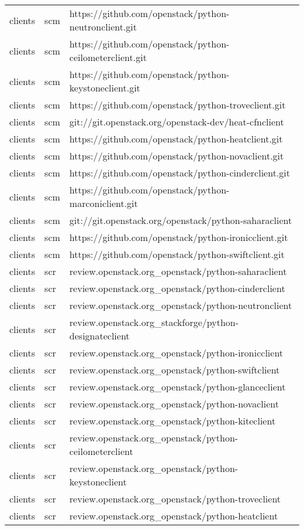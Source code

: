 \begin{center}
\begin{longtable}{|p{4cm}|p{1cm}|p{10cm}|}
clients&scm&https://github.com/openstack/python-neutronclient.git\\ 
clients&scm&https://github.com/openstack/python-ceilometerclient.git\\ 
clients&scm&https://github.com/openstack/python-keystoneclient.git\\ 
clients&scm&https://github.com/openstack/python-troveclient.git\\ 
clients&scm&git://git.openstack.org/openstack-dev/heat-cfnclient\\ 
clients&scm&https://github.com/openstack/python-heatclient.git\\ 
clients&scm&https://github.com/openstack/python-novaclient.git\\ 
clients&scm&https://github.com/openstack/python-cinderclient.git\\ 
clients&scm&https://github.com/openstack/python-marconiclient.git\\ 
clients&scm&git://git.openstack.org/openstack/python-saharaclient\\ 
clients&scm&https://github.com/openstack/python-ironicclient.git\\ 
clients&scm&https://github.com/openstack/python-swiftclient.git\\ 
clients&scr&review.openstack.org\_openstack/python-saharaclient\\ 
clients&scr&review.openstack.org\_openstack/python-cinderclient\\ 
clients&scr&review.openstack.org\_openstack/python-neutronclient\\ 
clients&scr&review.openstack.org\_stackforge/python-designateclient\\ 
clients&scr&review.openstack.org\_openstack/python-ironicclient\\ 
clients&scr&review.openstack.org\_openstack/python-swiftclient\\ 
clients&scr&review.openstack.org\_openstack/python-glanceclient\\ 
clients&scr&review.openstack.org\_openstack/python-novaclient\\ 
clients&scr&review.openstack.org\_openstack/python-kiteclient\\ 
clients&scr&review.openstack.org\_openstack/python-ceilometerclient\\ 
clients&scr&review.openstack.org\_openstack/python-keystoneclient\\ 
clients&scr&review.openstack.org\_openstack/python-troveclient\\ 
clients&scr&review.openstack.org\_openstack/python-heatclient\\ 

\end{longtable}
\end{center}
